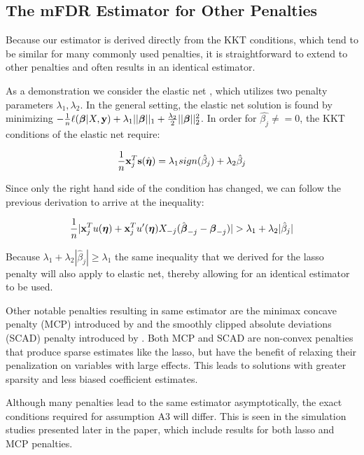 \subsection{The mFDR Estimator for Other Penalties}

Because our estimator is derived directly from the KKT conditions, which tend to be similar for many commonly used penalties, it is straightforward to extend to other penalties and often results in an identical estimator.

As a demonstration we consider the elastic net \citep{Elastic_Net}, which utilizes two penalty parameters $\lambda_1, \lambda_2$. In the general setting, the elastic net solution is found by minimizing $-\frac{1}{n} \ell(\boldsymbol{\beta}|X,\mathbf{y}) + \lambda_1 ||\boldsymbol{\beta}||_1 + \frac{\lambda_2}{2}||\boldsymbol{\beta}||_{2}^2 $. In order for $\hat{\beta_j} \neq = 0$, the KKT conditions of the elastic net \citep{lasso_kkt} require:

\begin{equation*}
\frac{1}{n}\mathbf{x}_{j}^T \mathbf{s}(\hat{\boldsymbol{\eta}}) = \lambda_1 sign(\hat{\beta}_j) + \lambda_2 \hat{\beta}_j
\end{equation*}

Since only the right hand side of the condition has changed, we can follow the previous derivation to arrive at the inequality:

\begin{equation*}
\frac{1}{n}|\mathbf{x}_j^T  u(\boldsymbol{\eta}) + \mathbf{x}_j^T u'(\boldsymbol{\eta})X_{-j}(\hat{\boldsymbol{\beta}}_{-j} -  \boldsymbol{\beta}_{-j}) |  > \lambda_1  + \lambda_2|\hat{\beta}_j|
\end{equation*}

Because $\lambda_1  + \lambda_2|\hat{\beta}_j| \geq \lambda_1$ the same inequality that we derived for the lasso penalty will also apply to elastic net, thereby allowing for an identical estimator to be used.

Other notable penalties resulting in same estimator are the minimax concave penalty (MCP) introduced by \citet{MCP} and the smoothly clipped absolute deviations (SCAD) penalty introduced by \citet{SCAD}.  Both MCP and SCAD are non-convex penalties that produce sparse estimates like the lasso, but have the benefit of relaxing their penalization on variables with large effects.  This leads to solutions with greater sparsity and less biased coefficient estimates.

Although many penalties lead to the same estimator asymptotically, the exact conditions required for assumption A3 will differ. This is seen in the simulation studies presented later in the paper, which include results for both lasso and MCP penalties.

